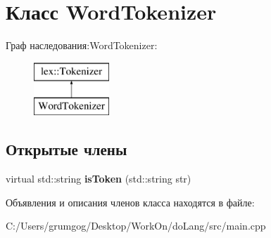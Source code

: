 \hypertarget{class_word_tokenizer}{}\section{Класс Word\+Tokenizer}
\label{class_word_tokenizer}
Граф наследования\+:Word\+Tokenizer\+:\begin{figure}[H]
\begin{center}
\leavevmode
\includegraphics[height=2.000000cm]{class_word_tokenizer}
\end{center}
\end{figure}
\subsection*{Открытые члены}
\begin{DoxyCompactItemize}
\item 
\mbox{\label{class_word_tokenizer_a2ac6a7b3bba01987dd42cda42dd71af8}} 
virtual std\+::string {\bfseries is\+Token} (std\+::string str)
\end{DoxyCompactItemize}


Объявления и описания членов класса находятся в файле\+:\begin{DoxyCompactItemize}
\item 
C\+:/\+Users/grumgog/\+Desktop/\+Work\+On/do\+Lang/src/main.\+cpp\end{DoxyCompactItemize}
